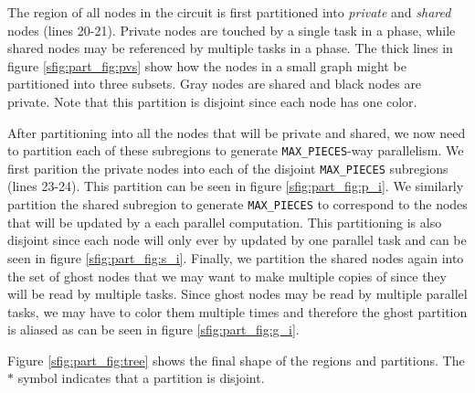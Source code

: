 The region of all nodes in the circuit is first partitioned into 
{\em private} and {\em shared} nodes (lines 20-21).  Private nodes
are touched by a single task in a phase, while shared nodes may
be referenced by multiple tasks in a phase.  The thick lines in figure \ref{sfig:part_fig:pvs}
show how the nodes in a small graph might be partitioned into three subsets.  Gray
nodes are shared and black nodes are private.  Note that
this partition is disjoint since each node has one color.

After partitioning into all the nodes that will be private and shared, we now
need to partition each of these subregions to generate {\tt MAX\_PIECES}-way
parallelism.  We first parition the private nodes into each of the disjoint
{\tt MAX\_PIECES} subregions (lines 23-24).  This partition can be seen in figure
\ref{sfig:part_fig:p_i}.  We similarly partition the shared subregion to
generate {\tt MAX\_PIECES} to correspond to the nodes that will be updated
by a each parallel computation.  This partitioning is also disjoint since
each node will only ever by updated by one parallel task and can be
seen in figure \ref{sfig:part_fig:s_i}.  Finally, we partition
the shared nodes again into the set of ghost nodes that we may want to make
multiple copies of since they will be read by multiple tasks.  Since
ghost nodes may be read by multiple parallel tasks, we may have to color
them multiple times and therefore the ghost partition is aliased
as can be seen in figure \ref{sfig:part_fig:g_i}.

Figure \ref{sfig:part_fig:tree} shows the final shape of the regions
and partitions.  The $*$ symbol indicates that a partition is 
disjoint.


